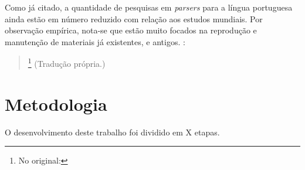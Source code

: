 Como já citado, a quantidade de pesquisas em \textit{parsers} para a língua portuguesa ainda estão em número reduzido com relação aos estudos mundiais. Por observação empírica, nota-se que estão muito focados na reprodução e manutenção de materiais já existentes, e antigos.
\cite[p~371]{Manning1999FoundationsNLP}:
\begin{quote}
    \footnote{No original: }
    (Tradução própria.)
\end{quote}



\section{Metodologia}\label{sec:metodologia}



O desenvolvimento deste trabalho foi dividido em X etapas.


